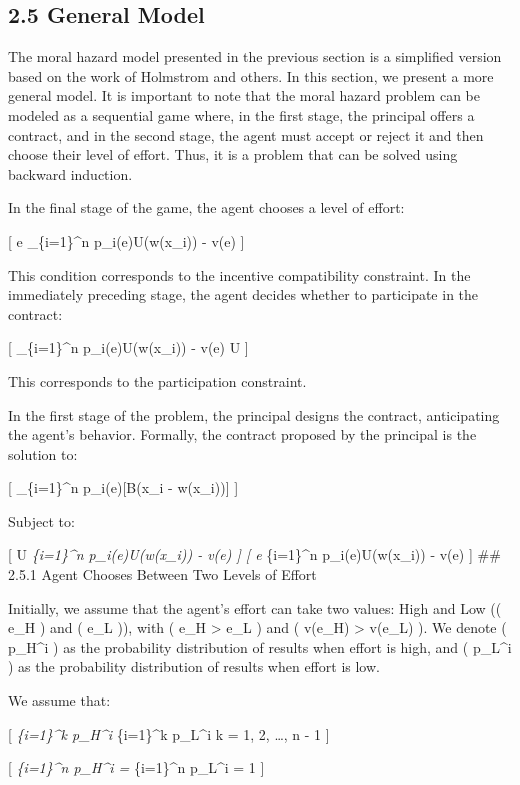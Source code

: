 \documentclass[
  letterpaper,
  DIV=11,
  numbers=noendperiod]{scrartcl}
\begin{document}
\subsection{2.5 General Model}\label{general-model}

The moral hazard model presented in the previous section is a simplified
version based on the work of Holmstrom and others. In this section, we
present a more general model. It is important to note that the moral
hazard problem can be modeled as a sequential game where, in the first
stage, the principal offers a contract, and in the second stage, the
agent must accept or reject it and then choose their level of effort.
Thus, it is a problem that can be solved using backward induction.

In the final stage of the game, the agent chooses a level of effort:

{[} e \in \max \sum\_\{i=1\}\^{}n p\_i(e)U(w(x\_i)) - v(e) {]}

This condition corresponds to the incentive compatibility constraint. In
the immediately preceding stage, the agent decides whether to
participate in the contract:

{[} \sum\_\{i=1\}\^{}n p\_i(e)U(w(x\_i)) - v(e) \geq U {]}

This corresponds to the participation constraint.

In the first stage of the problem, the principal designs the contract,
anticipating the agent's behavior. Formally, the contract proposed by
the principal is the solution to:

{[} \max \sum\_\{i=1\}\^{}n p\_i(e){[}B(x\_i - w(x\_i)){]} {]}

Subject to:

{[} U \leq \sum\emph{\{i=1\}\^{}n p\_i(e)U(w(x\_i)) - v(e) {]} {[} e
\in \max \sum}\{i=1\}\^{}n p\_i(e)U(w(x\_i)) - v(e) {]} \#\# 2.5.1 Agent
Chooses Between Two Levels of Effort

Initially, we assume that the agent's effort can take two values: High
and Low (( e\_H ) and ( e\_L )), with ( e\_H \textgreater{} e\_L ) and (
v(e\_H) \textgreater{} v(e\_L) ). We denote ( p\_H\^{}i ) as the
probability distribution of results when effort is high, and ( p\_L\^{}i
) as the probability distribution of results when effort is low.

We assume that:

{[} \sum\emph{\{i=1\}\^{}k p\_H\^{}i \geq \sum}\{i=1\}\^{}k p\_L\^{}i
\quad {} \quad k = 1, 2, \dots, n - 1 {]}

{[} \sum\emph{\{i=1\}\^{}n p\_H\^{}i = \sum}\{i=1\}\^{}n p\_L\^{}i = 1
{]}
\end{document}
